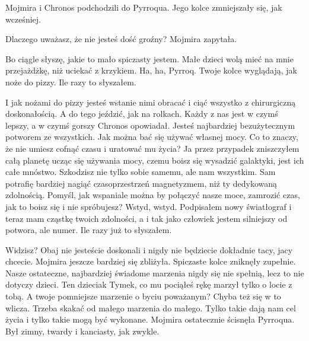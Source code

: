 Mojmira i Chronos podchodzili do Pyrroqua. Jego kolce zmniejszały się, jak wcześniej.

\ds{} Dlaczego uważasz, że nie jesteś dość groźny? \dm{} Mojmira zapytała. \de{}

\ds{} Bo ciągle słyszę, jakie to mało spiczasty jestem. Małe dzieci wolą mieć na mnie przejażdżkę, niż uciekać z krzykiem.
Ha, ha, Pyrroq. Twoje kolce wyglądają, jak noże do pizzy. Ile razy to słyszałem. \de{}

\ds{} I jak nożami do pizzy jesteś wstanie nimi obracać i ciąć wszystko z chirurgiczną doskonałością. A do tego jeździć, jak na rolkach.
Każdy z nas jest w czymś lepszy, a w czymś gorszy \dm{} Chronos opowiadał. \dm{} Jesteś najbardziej bezużytecznym potworem ze wszystkich. 
Jak można bać się używać własnej mocy. Co to znaczy, że nie umiesz cofnąć czasu i uratować mu życia? 
Ja przez przypadek zniszczyłem całą planetę ucząc się używania mocy, czemu boisz się wysadzić galaktyki, jest ich całe mnóstwo.
Szkodzisz nie tylko sobie samemu, ale nam wszystkim.
Sam potrafię bardziej nagiąć czasoprzestrzeń magnetyzmem, niż ty dedykowaną zdolnością.
Pomyśl, jak wspaniale można by połączyć nasze moce, zamrozić czas, jak to boisz się i nie spróbujesz? Wstyd, wstyd.
Podpisałem nowy światłograf i teraz mam cząstkę twoich zdolności, a i tak jako człowiek jestem silniejszy od potwora, ale numer.\dm{} Ile razy już to słyszałem. \de{}

\ds{} Widzisz? Obaj nie jesteście doskonali i nigdy nie będziecie dokładnie tacy, jacy chcecie. \dm{} Mojmira jeszcze bardziej się zbliżyła.
Spiczaste kolce zniknęły zupełnie. \dm{} Nasze ostateczne, najbardziej świadome marzenia nigdy się nie spełnią, lecz to nie dotyczy dzieci. 
Ten dzieciak Tymek, co mu pociąłeś rękę marzył tylko o locie z tobą. A twoje pomniejsze marzenie o byciu poważanym? Chyba też się w to wlicza.
Trzeba skakać od małego marzenia do małego. Tylko takie dają nam cel życia i tylko takie mogą być wykonane. \dm{} Mojmira ostatecznie ścisnęła Pyrroqua. 
Był zimny, twardy i kanciasty, jak zwykle. \de{}



















